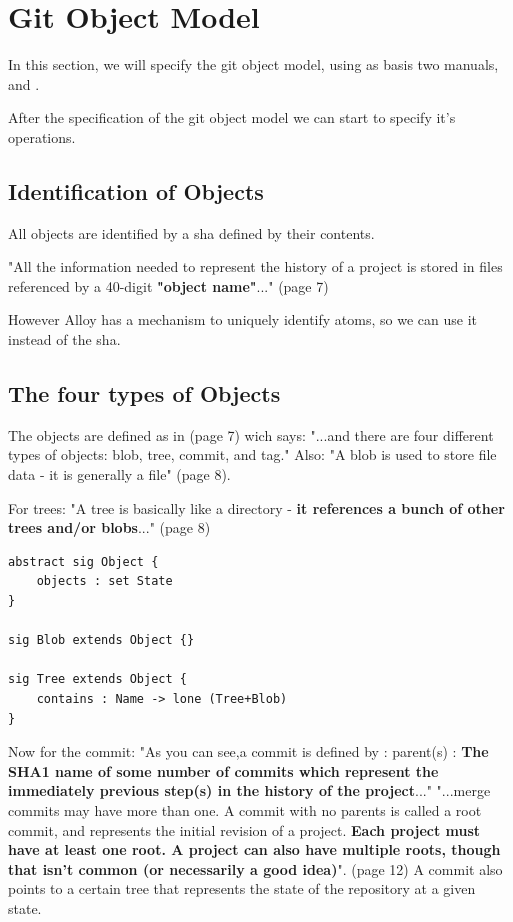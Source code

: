 \section{Git Object Model}

In this section, we will specify the git object model, using as
basis two manuals, \cite{gitComm} and \cite{progit}. \par
After the specification of the git object model we can start
to specify it's operations. \par

\subsection{Identification of Objects}
All objects are identified by a sha defined by their contents. \par
"All the information needed to represent the history
of a project is stored in files referenced by a 
40-digit {\bf "object name"}..." (page 7) \par

However Alloy has a mechanism to uniquely identify atoms, so 
we can use it instead of the sha. \par

\subsection{The four types of Objects}
The objects are defined as in \cite{gitComm} (page 7) wich says: 
"...and there are four different types of objects: blob,
tree, commit, and tag."
Also: "A blob is used to store file data - it is generally a file" 
\cite{gitComm} (page 8). \par
For trees: "A tree is basically like a directory 
- {\bf it references a bunch
of other trees and/or blobs}..." (page 8) \par 

\begin{lstlisting}
abstract sig Object {
	objects : set State
}

sig Blob extends Object {}

sig Tree extends Object {
	contains : Name -> lone (Tree+Blob)
}
\end{lstlisting}

Now for the commit:  
"As you can see,a commit is defined by : 
parent(s) : {\bf The SHA1 name of some number of commits which
represent the immediately previous step(s) in the 
history of the project}..."
"...merge commits may have more than one. A commit with no 
parents is called a root commit, and represents the 
initial revision of a project. {\bf Each project must have at
least one root. A project can also have multiple roots,
though that isn't common (or necessarily a good idea)}". \cite{gitComm} (page 12)
A commit also points to a certain tree that represents the state of the repository
at a given state. \par

